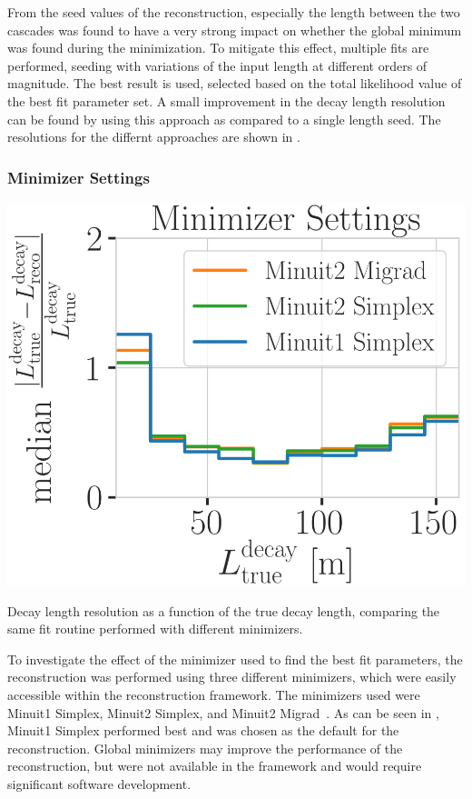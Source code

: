 From the seed values of the reconstruction, especially the length between the two cascades was found to have a very strong impact on whether the global minimum was found during the minimization. To mitigate this effect, multiple fits are performed, seeding with variations of the input length at different orders of magnitude. The best result is used, selected based on the total likelihood value of the best fit parameter set. A small improvement in the decay length resolution can be found by using this approach as compared to a single length seed. The resolutions for the differnt approaches are shown in .


\subsubsection{Minimizer Settings}

\begin{marginfigure}
	\centering
    \includegraphics{figures/results/190605_reco_optimization/minimizer_checks_median_decay_length_resolution_Good + L7 + reco E1,E2 above 3_fix_y_new.png}
    \caption[Decay length resolution to optimize minimizer settings]{Decay length resolution as a function of the true decay length, comparing the same fit routine performed with different minimizers.}
\end{marginfigure}

To investigate the effect of the minimizer used to find the best fit parameters, the reconstruction was performed using three different minimizers, which were easily accessible within the reconstruction framework. The minimizers used were Minuit1 Simplex, Minuit2 Simplex, and Minuit2 Migrad~. As can be seen in , Minuit1 Simplex performed best and was chosen as the default for the reconstruction. Global minimizers may improve the performance of the reconstruction, but were not available in the framework and would require significant software development.


